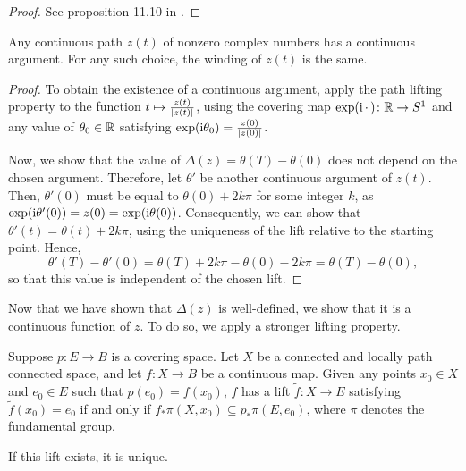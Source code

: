 \begin{proof}
See proposition 11.10 in \cite{leetopological}.
\end{proof}

\begin{corollary}
Any continuous path $z(t)$ of nonzero complex numbers has a continuous argument. For any such choice, the winding of $z(t)$ is the same.
\end{corollary}

\begin{proof}
To obtain the existence of a continuous argument, apply the path lifting property to the function $t \mapsto \frac{z(t)}{\lvert z(t)\rvert}$, using the covering map $\exp(\mathrm{i}\,\cdot\,) \colon \mathbb{R} \to S^1$ and any value of $\theta_0 \in \mathbb{R}$ satisfying $\exp(\mathrm{i} \theta_0) = \frac{z(0)}{\lvert z(0)\rvert}$.

Now, we show that the value of $\Delta(z) = \theta(T) - \theta(0)$ does not depend on the chosen argument. Therefore, let $\theta'$ be another continuous argument of $z(t)$. Then, $\theta'(0)$ must be equal to $\theta(0) + 2 k \pi$ for some integer $k$, as $\exp(\mathrm{i}\theta'(0)) = z(0) = \exp(\mathrm{i} \theta(0))$. Consequently, we can show that $\theta'(t) = \theta(t) + 2 k \pi$, using the uniqueness of the lift relative to the starting point. Hence,
\begin{equation}
\theta'(T) - \theta'(0) = \theta(T) + 2 k \pi -  \theta(0) - 2 k \pi = \theta(T) - \theta(0),
\end{equation}
so that this value is independent of the chosen lift.
\end{proof}

Now that we have shown that $\Delta(z)$ is well-defined, we show that it is a continuous function of $z$. To do so, we apply a stronger lifting property.

\begin{prop}
Suppose $p \colon E \to B$ is a covering space. Let $X$ be a connected and locally path connected space, and let $f \colon X \to B$ be a continuous map. Given any points $x_0 \in X$ and $e_0 \in E$ such that $p(e_0) = f(x_0)$, $f$ has a lift $\tilde f \colon X \to E$ satisfying $\tilde f(x_0) = e_0$ if and only if $f_* \pi(X,x_0) \subseteq p_* \pi(E,e_0)$, where $\pi$ denotes the fundamental group.

If this lift exists, it is unique.
\end{prop}

